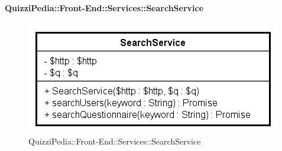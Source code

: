 \paragraph{QuizziPedia::Front-End::Services::SearchService}

\label{QuizziPedia::Front-End::Services::SearchService}
\begin{figure}[ht]
	\centering
	\includegraphics[scale=0.80]{UML/Classi/Front-End/QuizziPedia_Front-end_Services_SearchService.png}
	\caption{QuizziPedia::Front-End::Services::SearchService}
\end{figure}\FloatBarrier
